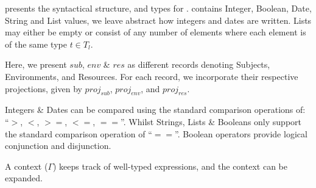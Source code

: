  presents the syntactical structure, and types for \thePolicyLang.
\thePolicyLang contains Integer, Boolean, Date, String and List values, we leave abstract how integers and dates are written. Lists may either be empty or consist of any number of elements where each element is of the same type $t \in T_l$.

Here, we present \textit{$sub$}, \textit{$env$} \& \textit{$res$} as different records denoting Subjects, Environments, and Resources. For each record, we incorporate their respective projections, given by \textit{$proj_{sub}$}, \textit{$proj_{env}$}, and \textit{$proj_{res}$}.

Integers \& Dates can be compared using the standard comparison operations of: ``\texttt{$>$}, \texttt{$<$}, \texttt{$>=$}, \texttt{$<=$}, \texttt{$==$}''. Whilst Strings, Lists \& Booleans only support the standard comparison operation of ``\texttt{$==$}''.
Boolean operators provide logical conjunction and disjunction.

A context ($\Gamma$) keeps track of well-typed expressions, and the \thePolicyLang context can be expanded.
